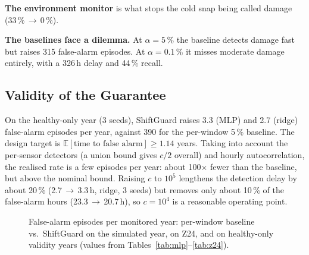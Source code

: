 \documentclass[conference]{IEEEtran}
\begin{document}
\textbf{The environment monitor} is what stops the cold snap being called damage (33\,\%\,$\rightarrow$\,0\,\%).

\textbf{The baselines face a dilemma.} At $\alpha=5\,\%$ the baseline detects damage fast but raises 315 false-alarm episodes. At $\alpha=0.1\,\%$ it misses moderate damage entirely, with a 326\,h delay and 44\,\% recall.

\subsection{Validity of the Guarantee}
On the healthy-only year (3 seeds), ShiftGuard raises 3.3 (MLP) and 2.7 (ridge) false-alarm episodes per year, against 390 for the per-window 5\,\% baseline. The design target is $\mathbb{E}[\text{time to false alarm}]\geq 1.14$ years. Taking into account the per-sensor detectors (a union bound gives $c/2$ overall) and hourly autocorrelation, the realised rate is a few episodes per year: about 100$\times$ fewer than the baseline, but above the nominal bound. Raising $c$ to $10^5$ lengthens the detection delay by about 20\,\% (2.7\,$\rightarrow$\,3.3\,h, ridge, 3 seeds) but removes only about 10\,\% of the false-alarm hours (23.3\,$\rightarrow$\,20.7\,h), so $c=10^4$ is a reasonable operating point.

\begin{figure}[t]
\centering
{}
\caption{False-alarm episodes per monitored year: per-window baseline vs.\ ShiftGuard on the simulated year, on Z24, and on healthy-only validity years (values from Tables~\ref{tab:mlp}--\ref{tab:z24}).}
\label{fig:fa}
\end{figure}
\end{document}

